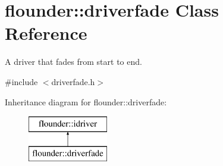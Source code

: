 \hypertarget{classflounder_1_1driverfade}{}\section{flounder\+:\+:driverfade Class Reference}
\label{classflounder_1_1driverfade}


A driver that fades from start to end.  




{\ttfamily \#include $<$driverfade.\+h$>$}

Inheritance diagram for flounder\+:\+:driverfade\+:\begin{figure}[H]
\begin{center}
\leavevmode
\includegraphics[height=2.000000cm]{classflounder_1_1driverfade}
\end{center}
\end{figure}
